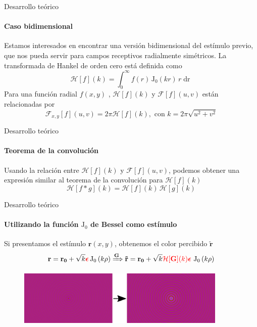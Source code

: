 \documentclass[
    11pt, %
    aspectratio=169, %
]{beamer}
\begin{document}
\begin{frame}{Desarrollo teórico}
    \framesubtitle{Caso bidimensional}
    Estamos interesados en encontrar una versión bidimensional del estímulo previo, que nos pueda servir para campos receptivos radialmente simétricos.\newline
    La transformada de Hankel de orden cero está definida como   \begin{equation*}
        \boxed{\mathcal{H}[f](k) =  \displaystyle\int_0^{\infty} f(r)\, \text{J}_0(k r)\, r \mathop{dr}}
    \end{equation*}\newline
    Para una función radial $f(x,y)$ , $\mathcal{H}[f](k)$ y $\mathcal{F}[f](u,v)$ están relacionadas por
    \begin{equation*}
         \boxed{\mathcal{F}_{x,y}[f](u,v) = 2\pi \mathcal{H}[f](k), \text{  con  } k = 2\pi \displaystyle\sqrt{u^2+v^2}}
    \end{equation*}
    
     
     

\end{frame}
\begin{frame}{Desarrollo teórico}
\framesubtitle{Teorema de la convolución}
Usando la relación entre $\mathcal{H}[f](k)$ y $\mathcal{F}[f](u,v)$, podemos obtener una expresión similar al teorema de la convolución para $\mathcal{H}[f](k)$
\begin{equation*}
    \boxed{\mathcal{H}[f*g](k) = \mathcal{H}[f](k)\,\mathcal{H}[g](k)}
\end{equation*}


\end{frame}
\begin{frame}{Desarrollo teórico}
\framesubtitle{Utilizando la función $\text{J}_0$ de Bessel como estímulo}
    Si presentamos el estímulo $\mathbf{r}(x,y)$, obtenemos el color percibido $\mathbf{\tilde{r}}$
    \begin{equation*}
        \mathbf{r} =  \mathbf{r_0} + \sqrt{k}\color{red}\bm{\epsilon}\color{black}\, \text{J}_0 \left(k\rho\right) \xRightarrow{\mathbf{G}} \mathbf{\tilde{r}} = \mathbf{r_0} + \sqrt{k}\color{red}\mathcal{H}[\mathbf{G}](k)\bm{\epsilon}\color{black} \, \,\text{J}_0\left(k\rho\right)  
    \end{equation*}

\begin{figure}
    \centering
    \includegraphics[width = 10cm]{Images/j0_estimulo_y_amplificada.png}
\end{figure}

\end{frame}
\end{document}
